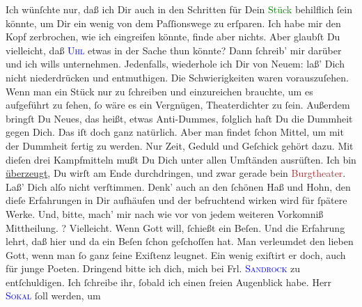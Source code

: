            \pstart
           Ich wünſchte nur, daß ich Dir auch in den Schritten für Dein \textcolor{green}{Stück}{} behilflich ſein könnte, um Dir ein wenig
               von dem Paſſionswege zu erſparen. Ich habe mir den Kopf zerbrochen, wie ich
               eingreifen könnte, finde aber nichts. Aber glaubſt Du vielleicht, daß {\pb}\textsc{\textcolor{blue}{Uhl}{}\ledrightnote{\textcolor{blue}{Friedrich Uhl}}} etwas in der Sache thun könnte? Dann ſchreib’ mir darüber und
               ich wills unternehmen. Jedenfalls, wiederhole ich Dir von Neuem: laß’ Dich nicht
               niederdrücken und entmuthigen. Die Schwierigkeiten waren vorauszuſehen. Wenn man ein
               Stück nur zu ſchreiben und einzureichen brauchte, um es aufgeführt zu ſehen, ſo wäre
               es ein Vergnügen, Theaterdichter zu ſein. Außerdem bringſt Du Neues, das heißt, etwas
               Anti-Dummes, folglich haſt Du die Dummheit gegen Dich. Das iſt doch ganz natürlich.
               Aber man findet ſchon Mittel, {\pb}um mit der Dummheit
               fertig zu werden. Nur Zeit, Geduld und Geſchick gehört dazu. Mit dieſen drei
               Kampfmitteln \strikeout{\textcolor{gray}{we}} mußt Du Dich unter
               allen Umſtänden ausrüſten. Ich bin \uline{überzeugt}, Du
               wirſt am Ende durchdringen, und zwar gerade bein \textcolor{brown}{Burgtheater}{}\ledrightnote{\textcolor{brown}{Burgtheater}}. Laß’ Dich alſo nicht verſtimmen. Denk’ auch an den ſchönen Haß
               und Hohn, den dieſe Erfahrungen in Dir aufhäufen und der befruchtend wirken wird für
                   ſpätere Werke. Und, bitte, mach’ mir nach wie
               vor von jedem weiteren Vorkomniß Mittheilung. \label{K_L02622-2v}\label{K_L02622-2h}? {\pb}Vielleicht. Wenn Gott will, ſchießt ein Beſen. Und
               die Erfahrung lehrt, daß hier und da ein Beſen ſchon geſchoſſen hat. Man  verleumdet den lieben Gott, wenn man ſo ganz ſeine
               Exiſtenz leugnet. Ein wenig exiſtirt er doch, auch für junge Poeten.\pend
           \pstart
           Dringend bitte ich dich, mich bei Frl. \textsc{\textcolor{blue}{Sandrock}{}\ledrightnote{\textcolor{blue}{Adele Sandrock}}} zu entſchuldigen. Ich ſchreibe ihr, ſobald ich
               einen ſreien Augenblick habe.\pend
           \pstart
           Herr \textsc{\textcolor{blue}{Sokal}{}\ledrightnote{\textcolor{blue}{Clemens Sokal}}} ſoll \label{K_L02622-3v}\label{K_L02622-3h} werden, {\pb}um
